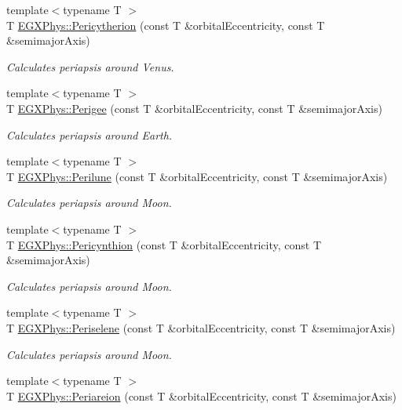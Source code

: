 \begin{DoxyCompactItemize}
{\footnotesize template$<$typename T $>$ }\\T \hyperlink{group___e_g_x_phys-_periapsis_gaa270e364cbbd7d3d6212872df484926f}{E\+G\+X\+Phys\+::\+Pericytherion} (const T \&orbital\+Eccentricity, const T \&semimajor\+Axis)
\begin{DoxyCompactList}\small\item\em Calculates periapsis around Venus. \end{DoxyCompactList}\item 
{\footnotesize template$<$typename T $>$ }\\T \hyperlink{group___e_g_x_phys-_periapsis_gae2d053caf69cb0b4c3207064a2ab143a}{E\+G\+X\+Phys\+::\+Perigee} (const T \&orbital\+Eccentricity, const T \&semimajor\+Axis)
\begin{DoxyCompactList}\small\item\em Calculates periapsis around Earth. \end{DoxyCompactList}\item 
{\footnotesize template$<$typename T $>$ }\\T \hyperlink{group___e_g_x_phys-_periapsis_ga2cc7ab05e18d32c94d8d74972e032793}{E\+G\+X\+Phys\+::\+Perilune} (const T \&orbital\+Eccentricity, const T \&semimajor\+Axis)
\begin{DoxyCompactList}\small\item\em Calculates periapsis around Moon. \end{DoxyCompactList}\item 
{\footnotesize template$<$typename T $>$ }\\T \hyperlink{group___e_g_x_phys-_periapsis_gaeeba153b188cd06cbd233eaef12f0a6a}{E\+G\+X\+Phys\+::\+Pericynthion} (const T \&orbital\+Eccentricity, const T \&semimajor\+Axis)
\begin{DoxyCompactList}\small\item\em Calculates periapsis around Moon. \end{DoxyCompactList}\item 
{\footnotesize template$<$typename T $>$ }\\T \hyperlink{group___e_g_x_phys-_periapsis_ga255874374dde571531e443cdbef9ef0c}{E\+G\+X\+Phys\+::\+Periselene} (const T \&orbital\+Eccentricity, const T \&semimajor\+Axis)
\begin{DoxyCompactList}\small\item\em Calculates periapsis around Moon. \end{DoxyCompactList}\item 
{\footnotesize template$<$typename T $>$ }\\T \hyperlink{group___e_g_x_phys-_periapsis_ga0617ba07a30b0fd0544c02f691bfae26}{E\+G\+X\+Phys\+::\+Periareion} (const T \&orbital\+Eccentricity, const T \&semimajor\+Axis)

\end{DoxyCompactItemize}
